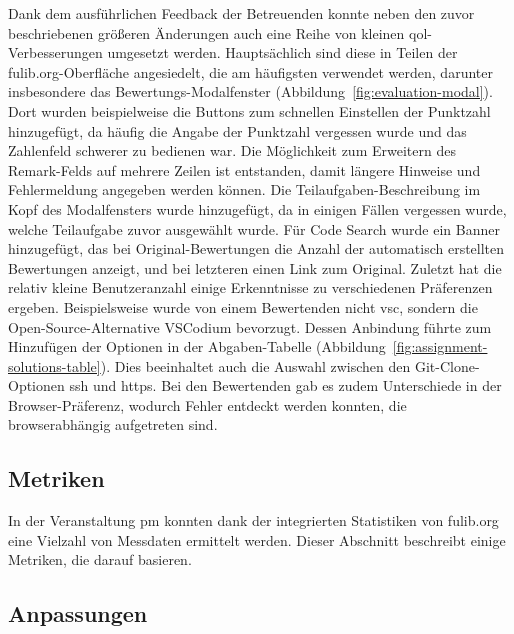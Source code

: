 Dank dem ausführlichen Feedback der Betreuenden konnte neben den zuvor beschriebenen größeren Änderungen auch eine Reihe von kleinen \ac{qol}-Verbesserungen umgesetzt werden.
Hauptsächlich sind diese in Teilen der fulib.org-Oberfläche angesiedelt, die am häufigsten verwendet werden, darunter insbesondere das Bewertungs-Modalfenster (Abbildung~\ref{fig:evaluation-modal}).
Dort wurden beispielweise die Buttons zum schnellen Einstellen der Punktzahl hinzugefügt, da häufig die Angabe der Punktzahl vergessen wurde und das Zahlenfeld schwerer zu bedienen war.
Die Möglichkeit zum Erweitern des Remark-Felds auf mehrere Zeilen ist entstanden, damit längere Hinweise und Fehlermeldung angegeben werden können.
Die Teilaufgaben-Beschreibung im Kopf des Modalfensters wurde hinzugefügt, da in einigen Fällen vergessen wurde, welche Teilaufgabe zuvor ausgewählt wurde.
Für Code Search wurde ein Banner hinzugefügt, das bei Original-Bewertungen die Anzahl der automatisch erstellten Bewertungen anzeigt, und bei letzteren einen Link zum Original.
Zuletzt hat die relativ kleine Benutzeranzahl einige Erkenntnisse zu verschiedenen Präferenzen ergeben.
Beispielsweise wurde von einem Bewertenden nicht \ac{vsc}, sondern die Open-Source-Alternative VSCodium bevorzugt.
Dessen Anbindung führte zum Hinzufügen der Optionen in der Abgaben-Tabelle (Abbildung~\ref{fig:assignment-solutions-table}).
Dies beeinhaltet auch die Auswahl zwischen den Git-Clone-Optionen \ac{ssh} und \ac{https}.
Bei den Bewertenden gab es zudem Unterschiede in der Browser-Präferenz, wodurch Fehler entdeckt werden konnten, die browserabhängig aufgetreten sind.

\subsection{Metriken}\label{subsec:pm-metrics}

In der Veranstaltung \ac{pm} konnten dank der integrierten Statistiken von fulib.org eine Vielzahl von Messdaten ermittelt werden.
Dieser Abschnitt beschreibt einige Metriken, die darauf basieren.


\subsection{Anpassungen}\label{subsec:pm-adaptations}

